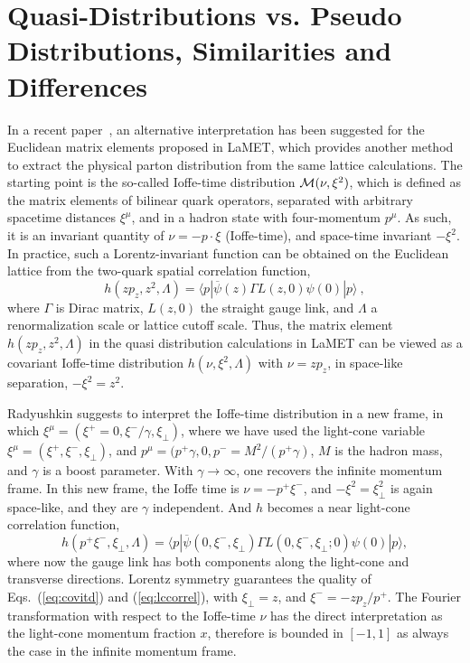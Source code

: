\section{Quasi-Distributions vs. Pseudo Distributions, Similarities and Differences}

In a recent paper~\cite{Radyushkin:2017cyf}, an alternative interpretation has been
suggested for the Euclidean matrix elements proposed in LaMET, which provides
another method to extract the physical parton distribution from the same lattice calculations.
The starting point is the so-called Ioffe-time distribution ${\cal M}(\nu,\xi^2)$,
which is defined as the matrix elements of bilinear quark operators, separated with arbitrary
spacetime distances $\xi^\mu$, and in a hadron state with four-momentum $p^\mu$. As such, it
is an invariant quantity of $\nu= -p\cdot \xi$ (Ioffe-time), and space-time invariant $-\xi^2$.
In practice, such a Lorentz-invariant function can be obtained
on the Euclidean lattice
from the two-quark spatial correlation function,
\begin{equation}\label{eq:covitd}
h(zp_z,z^2,\Lambda) =\langle p|\overline{\psi}(z)\Gamma L(z,0)\psi(0)|p\rangle \ ,
\end{equation}
where $\Gamma$ is Dirac matrix, $L(z,0)$ the straight gauge link, and $\Lambda$
a renormalization scale or lattice cutoff scale. Thus, the matrix element
$h(zp_z,z^2,\Lambda)$ in the quasi distribution calculations in LaMET
can be viewed as a covariant Ioffe-time distribution $h(\nu,\xi^2,\Lambda)$ with $\nu = zp_z$, in space-like separation, $-\xi^2 = z^2$.

Radyushkin suggests to interpret the Ioffe-time distribution in a new frame, in which
$\xi^\mu = (\xi^+=0, \xi^-/\gamma, \xi_\perp)$, where we have used the light-cone
variable $\xi^\mu = (\xi^+,\xi^-,\xi_\perp)$,  and $ p^\mu = (p^+\gamma, 0, p^-=M^2/(p^+\gamma)$,
$M$ is the hadron mass, and $\gamma$ is a boost parameter.
With $\gamma\rightarrow\infty$, one recovers the infinite momentum frame.
In this new frame, the Ioffe time is $\nu = -p^+\xi^-$, and $-\xi^2= \xi_\perp^2$ is again space-like,
and they are $\gamma$ independent. And $h$ becomes a near light-cone correlation function,
\begin{equation}\label{eq:lccorrel}
h(p^+\xi^-, \xi_\perp, \Lambda) =\langle p|\overline{\psi}(0,\xi^-,\xi_\perp)\Gamma L(0,\xi^-,\xi_\perp;0)\psi(0)|p\rangle,
\end{equation}
where now the gauge link has both components along the light-cone and transverse
directions. Lorentz symmetry guarantees the quality of Eqs.~(\ref{eq:covitd}) and (\ref{eq:lccorrel}), with $\xi_\perp = z$,
and $\xi^- = -zp_z/p^+$. The Fourier transformation with respect to the Ioffe-time $\nu$ has the direct
interpretation as the light-cone momentum fraction $x$, therefore is bounded in $[-1,1]$
as always the case in the infinite momentum frame.

